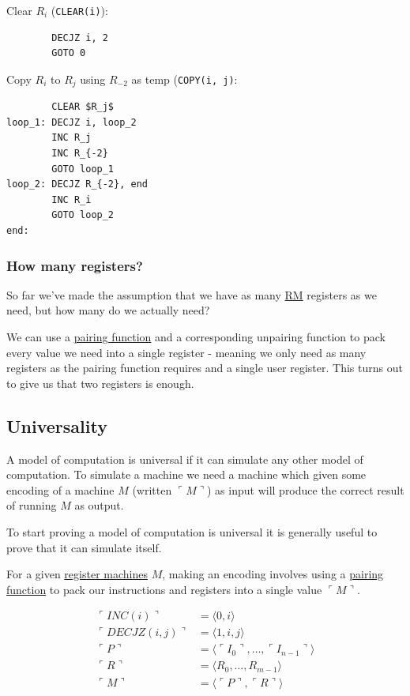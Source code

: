 \documentclass{article}
\begin{document}
Clear $R_i$ (\texttt{CLEAR(i)}):
\begin{lstlisting}
        DECJZ i, 2
        GOTO 0
\end{lstlisting}

Copy $R_i$ to $R_j$ using $R_{-2}$ as temp (\texttt{COPY(i, j)}:
\begin{lstlisting}
        CLEAR $R_j$
loop_1: DECJZ i, loop_2
        INC R_j
        INC R_{-2}
        GOTO loop_1
loop_2: DECJZ R_{-2}, end
        INC R_i
        GOTO loop_2
end:
\end{lstlisting}

\subsubsection{How many registers?}
So far we've made the assumption that we have as many \hyperref[rm]{RM} registers as we need, but how many do we actually need?

We can use a \hyperref[pairing-function]{pairing function} and a corresponding unpairing function to pack every value we need into a single register - meaning we only need as many registers as the pairing function requires and a single user register. This turns out to give us that two registers is enough.

\subsection{Universality}\label{universality}\label{encoding}
A model of computation is universal if it can simulate any other model of computation. To simulate a machine we need a machine which given some encoding of a machine $M$ (written $\ulcorner M \urcorner$) as input will produce the correct result of running $M$ as output.

To start proving a model of computation is universal it is generally useful to prove that it can simulate itself.

For a given \hyperref[rm]{register machines} $M$, making an encoding involves using a \hyperref[pairing-function]{pairing function} to pack our instructions and registers into a single value $\ulcorner M \urcorner$.

\begin{equation}
\begin{aligned}
    \ulcorner INC(i) \urcorner &= \langle 0, i \rangle \\
    \ulcorner DECJZ(i, j) \urcorner &= \langle 1, i, j \rangle \\
    \ulcorner P \urcorner &= \langle \ulcorner I_0 \urcorner, \dots, \ulcorner I_{n-1} \urcorner \rangle \\
    \ulcorner R \urcorner &= \langle R_0, \dots, R_{m-1} \rangle \\
    \ulcorner M \urcorner &= \langle \ulcorner P \urcorner, \ulcorner R \urcorner \rangle
\end{aligned}
\end{equation}
\end{document}
